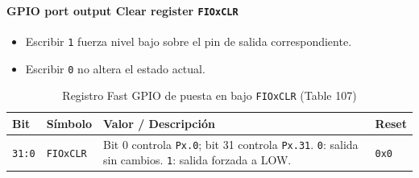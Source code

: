 \paragraph{GPIO port output Clear register \texttt{FIOxCLR}}
\begin{itemize}
  \item Escribir \texttt{1} fuerza nivel bajo sobre el pin de salida correspondiente.
  \item Escribir \texttt{0} no altera el estado actual.
\end{itemize}

\begin{table}[H]
  \centering
  \small
  \caption{Registro Fast GPIO de puesta en bajo \texttt{FIOxCLR} (Table 107)}
  \begin{tabularx}{0.96\textwidth}{|>{\centering\arraybackslash}p{}|>{\raggedright\arraybackslash}p{}|>{\raggedright\arraybackslash}X|>{\centering\arraybackslash}p{}|}
    \hline
    \textbf{Bit} & \textbf{Símbolo} & \textbf{Valor / Descripción} & \textbf{Reset} \\
    \hline
    \texttt{31:0} & \texttt{FIOxCLR} & Bit 0 controla \texttt{Px.0}; bit 31 controla \texttt{Px.31}. \texttt{0}: salida sin cambios. \texttt{1}: salida forzada a LOW. & \texttt{0x0} \\
    \hline
  \end{tabularx}
\end{table}

